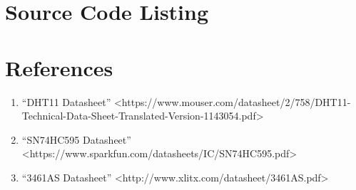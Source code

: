\documentclass[12pt,letterpaper]{article}
\begin{document}
\newpage\appendix
\section{Source Code Listing}


\section{References}
\begin{enumerate}
	\item ``DHT11 Datasheet'' <https://www.mouser.com/datasheet/2/758/DHT11-Technical-Data-Sheet-Translated-Version-1143054.pdf>
	\item ``SN74HC595 Datasheet'' <https://www.sparkfun.com/datasheets/IC/SN74HC595.pdf>
	\item ``3461AS Datasheet'' <http://www.xlitx.com/datasheet/3461AS.pdf>
\end{enumerate}
\end{document}
